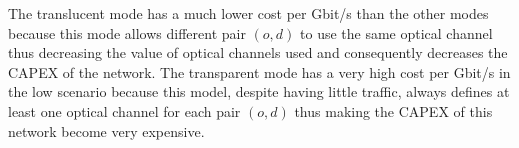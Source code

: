 The translucent mode has a much lower cost per Gbit/s than the other modes because this mode allows different pair $(o,d)$ to use the same optical channel thus decreasing the value of optical channels used and consequently decreases the CAPEX of the network.
The transparent mode has a very high cost per Gbit/s in the low scenario because this model, despite having little traffic, always defines at least one optical channel for each pair $(o,d)$ thus making the CAPEX of this network become very expensive.

